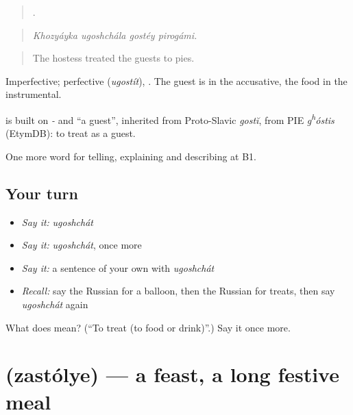 \begin{quote}
   .
\end{quote}

\begin{quote}
\emph{Khozyáyka ugoshchála gostéy pirogámi.}
\end{quote}

\begin{quote}
The hostess treated the guests to pies.
\end{quote}

Imperfective; perfective \emph{} (\emph{ugostít}), \emph{}. The guest is in the accusative, the food in the instrumental.

\begin{cousinweb}
\emph{} is built on \emph{-} and \emph{} \textquotedblleft{}a guest\textquotedblright{}, inherited from Proto-Slavic \emph{gostĭ}, from PIE \emph{g\textsuperscript{h}óstis} (EtymDB): to treat as a guest.
\end{cousinweb}

\begin{grammarlens}[title={What you've built}]
One more word for telling, explaining and describing at B1.
\end{grammarlens}

\subsection*{Your turn}
\begin{itemize}
\raggedright
  \item \emph{Say it:} \emph{ugoshchát}
  \item \emph{Say it:} \emph{ugoshchát}, once more
  \item \emph{Say it:} a sentence of your own with \emph{ugoshchát}
  \item \emph{Recall:} say the Russian for a balloon, then the Russian for treats, then say \emph{ugoshchát} again
\end{itemize}

\begin{tcolorbox}[breakable,colback=teal!4,colframe=teal!35!black,title={Before you move on}]
What does  mean? (\textquotedblleft{}To treat (to food or drink)\textquotedblright{}.) Say it once more.
\end{tcolorbox}
\section[\texorpdfstring{\ru{застолье} (zastólye)}{застолье (zastólye)}]{ (zastólye) — a feast, a long festive meal}

